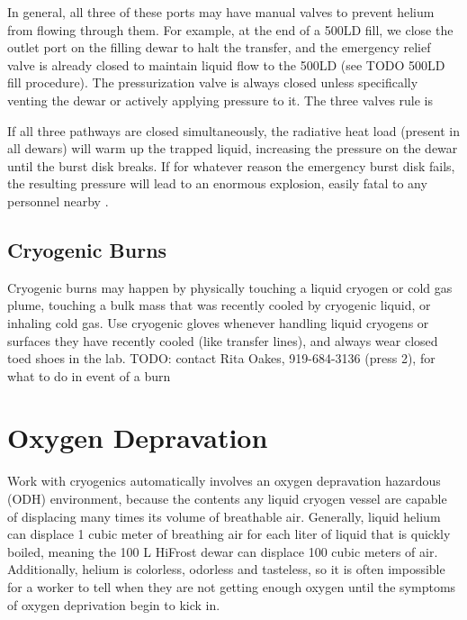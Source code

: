 In general, all three of these ports may have manual valves to prevent helium from flowing through them.  For example, at the end of a 500LD fill, we close the outlet port on the filling dewar to halt the transfer, and the emergency relief valve is already closed to maintain liquid flow to the 500LD (see TODO 500LD fill procedure).  The pressurization valve is always closed unless specifically venting the dewar or actively applying pressure to it.  The three valves rule is


If all three pathways are closed simultaneously, the radiative heat load (present in all dewars) will warm up the trapped liquid, increasing the pressure on the dewar until the burst disk breaks.  If for whatever reason the emergency burst disk fails, the resulting pressure will lead to an enormous explosion, easily fatal to any personnel nearby \cite{lnexplosion}. 

\subsection{Cryogenic Burns}
Cryogenic burns may happen by physically touching a liquid cryogen or cold gas plume, touching a bulk mass that was recently cooled by cryogenic liquid, or inhaling cold gas.  Use cryogenic gloves whenever handling liquid cryogens or surfaces they have recently cooled (like transfer lines), and always wear closed toed shoes in the lab. TODO: contact Rita Oakes, 919-684-3136 (press 2), for what to do in event of a burn

\section{Oxygen Depravation}

Work with cryogenics automatically involves an oxygen depravation hazardous (ODH) environment, because the contents any liquid cryogen vessel are capable of displacing many times its volume of breathable air.  Generally, liquid helium can displace 1 cubic meter of breathing air for each liter of liquid that is quickly boiled, meaning the 100 L HiFrost dewar can displace 100 cubic meters of air.  Additionally, helium is colorless, odorless and tasteless, so it is often impossible for a worker to tell when they are not getting enough oxygen until the symptoms of oxygen deprivation begin to kick in.

